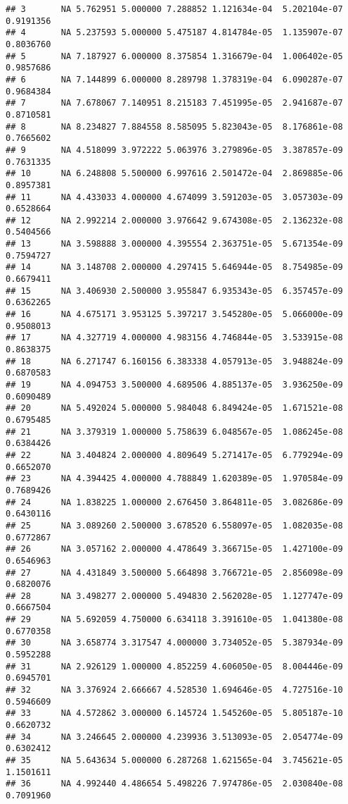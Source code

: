 \documentclass[]{article}
\begin{document}
\begin{verbatim}
## 3       NA 5.762951 5.000000 7.288852 1.121634e-04  5.202104e-07 0.9191356
## 4       NA 5.237593 5.000000 5.475187 4.814784e-05  1.135907e-07 0.8036760
## 5       NA 7.187927 6.000000 8.375854 1.316679e-04  1.006402e-05 0.9857686
## 6       NA 7.144899 6.000000 8.289798 1.378319e-04  6.090287e-07 0.9684384
## 7       NA 7.678067 7.140951 8.215183 7.451995e-05  2.941687e-07 0.8710581
## 8       NA 8.234827 7.884558 8.585095 5.823043e-05  8.176861e-08 0.7665602
## 9       NA 4.518099 3.972222 5.063976 3.279896e-05  3.387857e-09 0.7631335
## 10      NA 6.248808 5.500000 6.997616 2.501472e-04  2.869885e-06 0.8957381
## 11      NA 4.433033 4.000000 4.674099 3.591203e-05  3.057303e-09 0.6528664
## 12      NA 2.992214 2.000000 3.976642 9.674308e-05  2.136232e-08 0.5404566
## 13      NA 3.598888 3.000000 4.395554 2.363751e-05  5.671354e-09 0.7594727
## 14      NA 3.148708 2.000000 4.297415 5.646944e-05  8.754985e-09 0.6679411
## 15      NA 3.406930 2.500000 3.955847 6.935343e-05  6.357457e-09 0.6362265
## 16      NA 4.675171 3.953125 5.397217 3.545280e-05  5.066000e-09 0.9508013
## 17      NA 4.327719 4.000000 4.983156 4.746844e-05  3.533915e-08 0.8638375
## 18      NA 6.271747 6.160156 6.383338 4.057913e-05  3.948824e-09 0.6870583
## 19      NA 4.094753 3.500000 4.689506 4.885137e-05  3.936250e-09 0.6090489
## 20      NA 5.492024 5.000000 5.984048 6.849424e-05  1.671521e-08 0.6795485
## 21      NA 3.379319 1.000000 5.758639 6.048567e-05  1.086245e-08 0.6384426
## 22      NA 3.404824 2.000000 4.809649 5.271417e-05  6.779294e-09 0.6652070
## 23      NA 4.394425 4.000000 4.788849 1.620389e-05  1.970584e-09 0.7689426
## 24      NA 1.838225 1.000000 2.676450 3.864811e-05  3.082686e-09 0.6430116
## 25      NA 3.089260 2.500000 3.678520 6.558097e-05  1.082035e-08 0.6772867
## 26      NA 3.057162 2.000000 4.478649 3.366715e-05  1.427100e-09 0.6546963
## 27      NA 4.431849 3.500000 5.664898 3.766721e-05  2.856098e-09 0.6820076
## 28      NA 3.498277 2.000000 5.494830 2.562028e-05  1.127747e-09 0.6667504
## 29      NA 5.692059 4.750000 6.634118 3.391610e-05  1.041380e-08 0.6770358
## 30      NA 3.658774 3.317547 4.000000 3.734052e-05  5.387934e-09 0.5952288
## 31      NA 2.926129 1.000000 4.852259 4.606050e-05  8.004446e-09 0.6945701
## 32      NA 3.376924 2.666667 4.528530 1.694646e-05  4.727516e-10 0.5946609
## 33      NA 4.572862 3.000000 6.145724 1.545260e-05  5.805187e-10 0.6620732
## 34      NA 3.246645 2.000000 4.239936 3.513093e-05  2.054774e-09 0.6302412
## 35      NA 5.643634 5.000000 6.287268 1.621565e-04  3.745621e-05 1.1501611
## 36      NA 4.992440 4.486654 5.498226 7.974786e-05  2.030840e-08 0.7091960

\end{verbatim}
\end{document}
